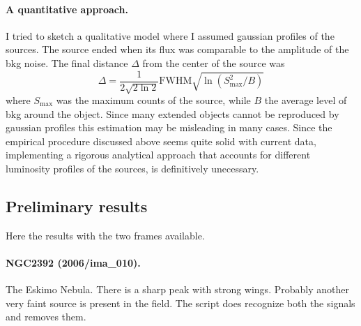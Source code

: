 \documentclass{article}
\begin{document}
\paragraph{A quantitative approach.} I tried to sketch a qualitative model where I assumed gaussian profiles of the sources. The source ended when its flux was comparable to the amplitude of the bkg noise. The final distance $\Delta$ from the center of the source was
\[\Delta = \frac{1}{2\sqrt{2\ln 2}}\text{FWHM}\sqrt{\ln(S_\text{max}^2/B)}   \]
where $S_\text{max}$ was the maximum counts of the source, while $B$ the average level of bkg around the object. Since many extended objects cannot be reproduced by gaussian profiles this estimation may be misleading in many cases. Since the empirical procedure discussed above seems quite solid with current data, implementing a rigorous analytical approach that accounts for different luminosity profiles of the sources, is definitively unecessary.


\subsection{Preliminary results}
Here the results with the two frames available.

\paragraph{NGC2392 (2006/ima\_010).} The Eskimo Nebula. There is a sharp peak with strong wings. Probably another very faint source is present in the field. The script does recognize both the signals and removes them.
\end{document}
